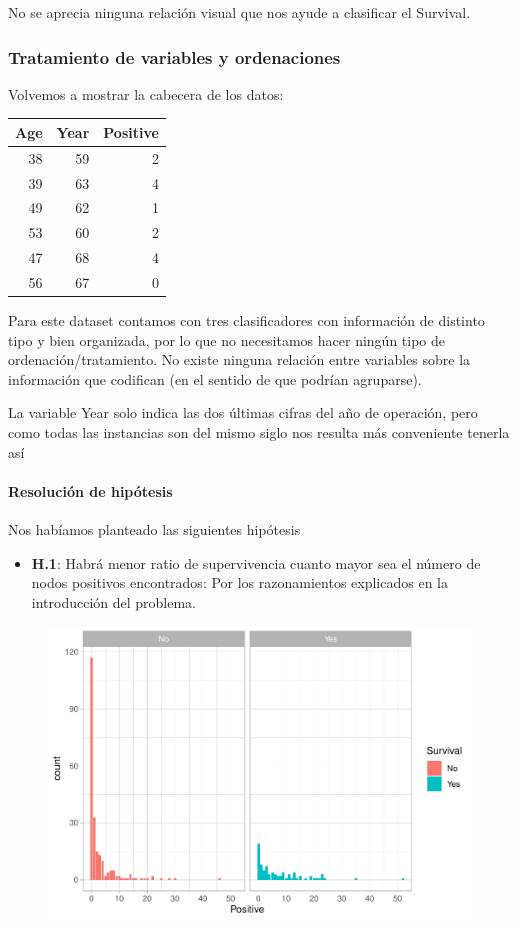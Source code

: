 No se aprecia ninguna relación visual que nos ayude a clasificar el Survival.

\subsubsection{Tratamiento de variables y ordenaciones}

Volvemos a mostrar la cabecera de los datos:

\begin{tabular}{r|r|r}
\hline
Age & Year & Positive\\
\hline
38 & 59 & 2\\
\hline
39 & 63 & 4\\
\hline
49 & 62 & 1\\
\hline
53 & 60 & 2\\
\hline
47 & 68 & 4\\
\hline
56 & 67 & 0\\
\hline
\end{tabular}

Para este dataset contamos con tres clasificadores con información de distinto tipo y bien organizada, por lo que no necesitamos hacer ningún tipo de ordenación/tratamiento. No existe ninguna relación entre variables sobre la información que codifican (en el sentido de que
podrían agruparse).

La variable Year solo indica las dos últimas cifras del año de operación, pero como todas las instancias son del mismo siglo nos resulta más conveniente tenerla así

\paragraph{Resolución de hipótesis}

Nos habíamos planteado las siguientes hipótesis

\begin{itemize}
    \item \textbf{H.1}: Habrá menor ratio de supervivencia cuanto mayor sea el número de nodos positivos encontrados: Por los razonamientos explicados en la introducción del problema.
\end{itemize}

\begin{figure}[H]\includegraphics[width=.9\linewidth]{img/EDA2_files/figure-latex/unnamed-chunk-31-1} \end{figure}

